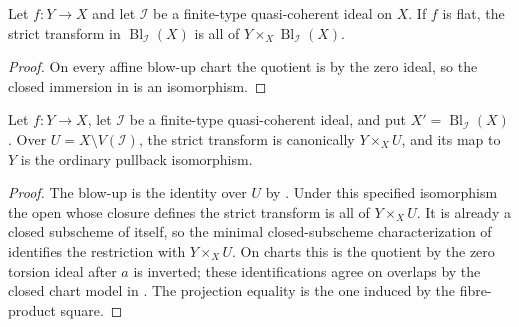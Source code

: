 \begin{corollary}
  \label{cor:nagata-flat-strict-transform-base-change}

  Let $f\colon Y\to X$ and let $\mathcal I$ be a finite-type quasi-coherent
  ideal on $X$.  If $f$ is flat, the strict transform in
  $\operatorname{Bl}_{\mathcal I}(X)$ is all of
  $Y\times_X\operatorname{Bl}_{\mathcal I}(X)$.
\end{corollary}

\begin{proof}
  On every affine blow-up chart the quotient is by the zero ideal, so the
  closed immersion in
   is an isomorphism.
\end{proof}

\begin{lemma}
  \label{lemma:nagata-strict-transform-over-complement}

  Let $f\colon Y\to X$, let $\mathcal I$ be a finite-type quasi-coherent
  ideal, and put $X'=\operatorname{Bl}_{\mathcal I}(X)$.  Over
  $U=X\setminus V(\mathcal I)$, the strict transform is canonically
  $Y\times_XU$, and its map to $Y$ is the ordinary pullback isomorphism.
\end{lemma}

\begin{proof}
  The blow-up is the identity over $U$ by
  .  Under this specified
  isomorphism the open whose closure defines the strict transform is all of
  $Y\times_XU$.  It is already a closed subscheme of itself, so the minimal
  closed-subscheme characterization of
   identifies
  the restriction with $Y\times_XU$.  On charts this is the quotient by the
  zero torsion ideal after $a$ is inverted; these identifications agree on
  overlaps by the closed chart model in
  .  The projection
  equality is the one induced by the fibre-product square.
\end{proof}


